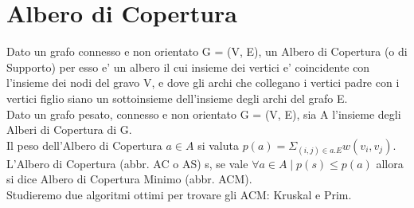\chapter{Albero di Copertura}

Dato un grafo connesso e non orientato G = (V, E), un Albero di Copertura (o di Supporto) per esso e' un albero il cui insieme dei vertici e' coincidente con l'insieme dei nodi del gravo V, e dove gli archi che collegano i vertici padre con i vertici figlio siano un sottoinsieme dell'insieme degli archi del grafo E. \\

Dato un grafo pesato, connesso e non orientato G = (V, E), sia A l'insieme degli Alberi di Copertura di G. \\

Il peso dell'Albero di Copertura $a \in A$ si valuta $p(a) = \Sigma_{(i,j) \in a.E} w(v_i,v_j)$. \\

L'Albero di Copertura (abbr. AC o AS) s, se vale $\forall a \in A \mid p(s) \leq p(a)$ allora si dice Albero di Copertura Minimo (abbr. ACM). \\

Studieremo due algoritmi ottimi per trovare gli ACM: Kruskal e Prim.
